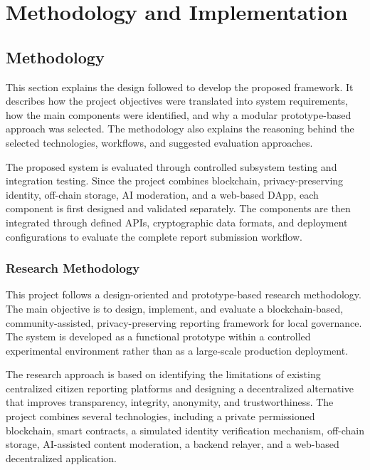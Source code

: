 \chapter{Methodology and Implementation}

\section{Methodology}
This section explains the design followed to develop the proposed framework. It describes how the project objectives were translated into system requirements, how the main components were identified, and why a modular prototype-based approach was selected. The methodology also explains the reasoning behind the selected technologies, workflows, and suggested evaluation approaches.

The proposed system is evaluated through controlled subsystem testing and integration testing. Since the project combines blockchain, privacy-preserving identity, off-chain storage, AI moderation, and a web-based DApp, each component is first designed and validated separately. The components are then integrated through defined APIs, cryptographic data formats, and deployment configurations to evaluate the complete report submission workflow.

\subsection{Research Methodology}

This project follows a design-oriented and prototype-based research methodology. 
The main objective is to design, implement, and evaluate a blockchain-based, 
community-assisted, privacy-preserving reporting framework for local governance. 
The system is developed as a functional prototype within a controlled experimental 
environment rather than as a large-scale production deployment.

The research approach is based on identifying the limitations of existing centralized 
citizen reporting platforms and designing a decentralized alternative that improves 
transparency, integrity, anonymity, and trustworthiness. The project combines several 
technologies, including a private permissioned blockchain, smart contracts, a simulated 
identity verification mechanism, off-chain storage, AI-assisted content moderation, a 
backend relayer, and a web-based decentralized application.

